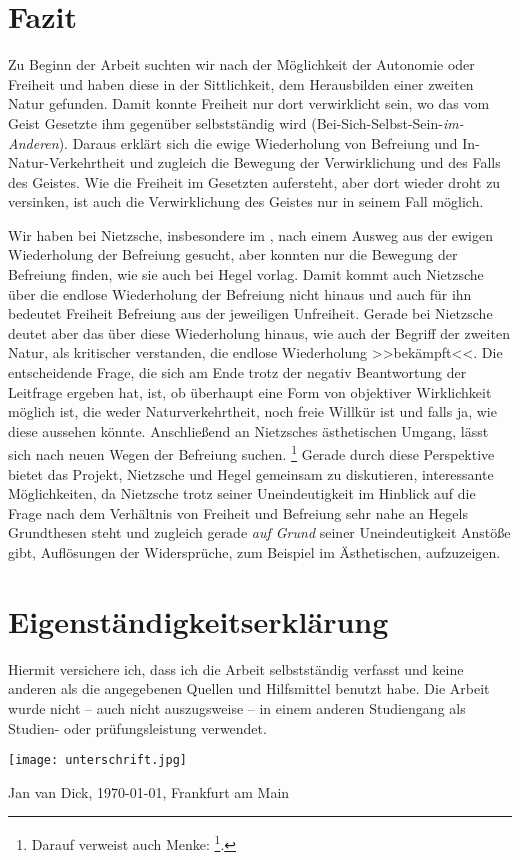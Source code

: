 \documentclass[12pt, a4paper, openany]{report}
\begin{document}
\chapter{Fazit}
Zu Beginn der Arbeit suchten wir nach der Möglichkeit der Autonomie oder Freiheit und haben diese in der Sittlichkeit, dem Herausbilden einer zweiten Natur gefunden.
Damit konnte Freiheit nur dort verwirklicht sein, wo das vom Geist Gesetzte ihm gegenüber selbstständig wird (Bei-Sich-Selbst-Sein-\emph{im-Anderen}).
Daraus erklärt sich die ewige Wiederholung von Befreiung und In-Natur-Verkehrtheit und zugleich die Bewegung der Verwirklichung und des Falls des Geistes. 
Wie die Freiheit im Gesetzten aufersteht, aber dort wieder droht zu versinken, ist auch die Verwirklichung des Geistes nur in seinem Fall möglich.

Wir haben bei Nietzsche, insbesondere im , nach einem Ausweg aus der ewigen Wiederholung der Befreiung gesucht, aber konnten nur die Bewegung der Befreiung finden, wie sie auch bei Hegel vorlag. 
Damit kommt auch Nietzsche über die endlose Wiederholung der Befreiung nicht hinaus und auch für ihn bedeutet Freiheit Befreiung aus der jeweiligen Unfreiheit. 
Gerade bei Nietzsche deutet aber das  über diese Wiederholung hinaus, wie auch der Begriff der zweiten Natur, als kritischer verstanden, die endlose Wiederholung >>bekämpft<<. 
Die entscheidende Frage, die sich am Ende trotz der negativ Beantwortung der Leitfrage ergeben hat, ist, ob überhaupt eine Form von objektiver Wirklichkeit möglich ist, die weder Naturverkehrtheit, noch freie Willkür ist und falls ja, wie diese aussehen könnte.
Anschließend an Nietzsches ästhetischen Umgang, lässt sich nach neuen Wegen der Befreiung suchen.%
\footnote{
    Darauf verweist auch Menke: \footcite[][50]{menke_autonomie_2018}.
}
Gerade durch diese Perspektive bietet das Projekt, Nietzsche und Hegel gemeinsam zu diskutieren, interessante Möglichkeiten, da Nietzsche trotz seiner Uneindeutigkeit im Hinblick auf die Frage nach dem Verhältnis von Freiheit und Befreiung sehr nahe an Hegels Grundthesen steht und zugleich gerade \emph{auf Grund} seiner Uneindeutigkeit Anstöße gibt, Auflösungen der Widersprüche, zum Beispiel im Ästhetischen, aufzuzeigen.

\backmatter
\printbibliography
{}

\chapter*{Eigenständigkeitserklärung}
Hiermit versichere ich, dass ich die Arbeit selbstständig verfasst und keine anderen als die angegebenen Quellen und Hilfsmittel benutzt habe. 
Die Arbeit wurde nicht -- auch nicht auszugsweise -- in einem anderen Studiengang als Studien- oder prüfungsleistung verwendet. \par\medskip
\texttt{[image: unterschrift.jpg]} \par
Jan van Dick, \today, Frankfurt am Main

\end{document}
